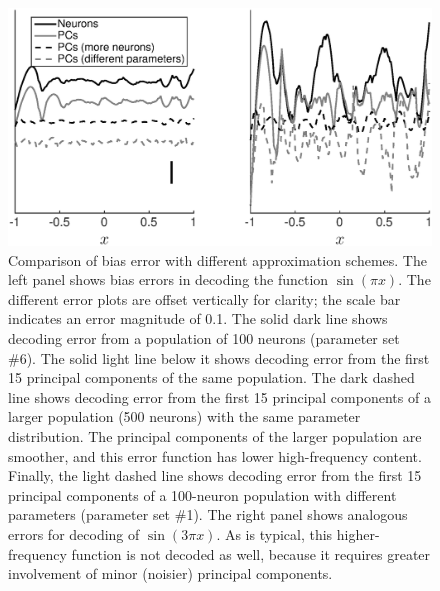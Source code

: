 \documentclass[]{article}
\begin{document}
\begin{figure}
\centering{}
\includegraphics[scale=0.4]{shared-PCs.eps}
\caption{Comparison of bias error with different approximation schemes. The left panel shows bias errors in decoding the function $\sin(\pi x)$. The different error plots are offset vertically for clarity; the scale bar indicates an error magnitude of 0.1. The solid dark line shows decoding error from a population of 100 neurons (parameter set \#6). The solid light line below it shows decoding error from the first 15 principal components of the same population. The dark dashed line shows decoding error from the first 15 principal components of a larger population (500 neurons) with the same parameter distribution. The principal components of the larger population are smoother, and this error function has lower high-frequency content. Finally, the light dashed line shows decoding error from the first 15 principal components of a 100-neuron population with different parameters (parameter set \#1). The right panel shows analogous errors for decoding of $\sin(3 \pi x)$. As is typical, this higher-frequency function is not decoded as well, because it requires greater involvement of minor (noisier) principal components. } 
\label{fig:shared-pcs}
\end{figure}
\end{document}
